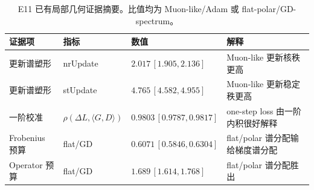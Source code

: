 \begin{table}[t]
\centering
\caption{E11 已有局部几何证据摘要。比值均为 Muon-like/Adam 或 flat-polar/GD-spectrum。}
\label{tab:e11-core}
\begin{tabular}{llll}
\toprule
证据项 & 指标 & 数值 & 解释 \\
\midrule
更新谱塑形 & nrUpdate & $2.017\,[1.905,2.136]$ & Muon-like 更新核秩更高 \\
更新谱塑形 & stUpdate & $4.765\,[4.582,4.955]$ & Muon-like 更新稳定秩更高 \\
一阶校准 & $\rho(\Delta L,\langle G,D\rangle)$ & $0.9803\,[0.9787,0.9817]$ & one-step loss 由一阶内积很好解释 \\
Frobenius 预算 & flat/GD & $0.6071\,[0.5846,0.6304]$ & flat/polar 谱分配输给梯度谱分配 \\
Operator 预算 & flat/GD & $1.689\,[1.614,1.768]$ & flat/polar 谱分配胜出 \\
\bottomrule
\end{tabular}
\end{table}
